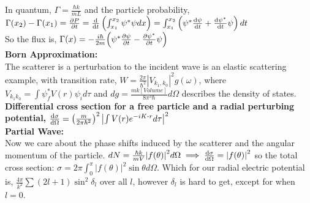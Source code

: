 \documentclass[10pt,landscape,a4paper]{article}
\newcommand{\minititle}[1]{\textbf{#1:}\\}
\renewcommand{\^}[1]{\ensuremath{\hat{#1}}}
\newcommand{\h}{\hbar}
\begin{document}
\begin{multicols}{4}
	In quantum, $ \Gamma = \frac{\h k}{mL} $ and the particle probability, $ \Gamma(x_2)-\Gamma(x_1) = \pdv{P}{t} = \dv{t}\left(\int_{x_1}^{x_2}\psi^*\psi dx\right) = \int_{x_1}^{x_2}\left(\psi^*\pagebreak\dv{\psi}{t}+\dv{\psi^*}{t}\psi\right)dt $\\
	So the flux is, $ \Gamma(x) = -\frac{i\h}{2m}\qty(\psi^*\pdv{\psi}{t}-\pdv{\psi^*}{t}\psi) $\\
	\minititle{Born Approximation}
	The scatterer is a perturbation to the incident wave is an elastic scattering example, with transition rate, $ W = \frac{2\pi}{\h^2}|V_{k_1,k_0}|^2 g(\omega) $, where $ V_{k_1 k_0} = \int\psi^*_f V(r)\psi_i d\tau $ and $ dg = \frac{mk\left[Volume\right]}{8\pi^3\h}d\Omega $ describes the density of states.\\
	\textbf{Differential cross section for a free particle and a radial perturbing potential,} $ \dv{\sigma}{\Omega} (\theta,\phi) = \left(\frac{m}{2\pi\h^2}\right)^2\left|\int V(r)e^{-iK\vdot r}d\tau \right|^2 $\\
	\minititle{Partial Wave}
	Now we care about the phase shifts induced by the scatterer and the angular momentum of the particle. $ dN = \frac{\h k}{mV}\abs{f(\theta)}^2d\Omega \implies \dv{\sigma}{\Omega} = \abs{f(\theta)}^2 $ so the total cross section: $ \sigma = 2\pi\int_0^\pi |f(\theta)|^2\sin\theta d\Omega $. Which for our radial electric potential is, $ \frac{4\pi}{k^2}\sum(2l+1)\sin^2\delta_l $ over all $ l $, however $ \delta_l $ is hard to get, except for when $ l=0 $.
	
	\end{multicols}
\end{document}
